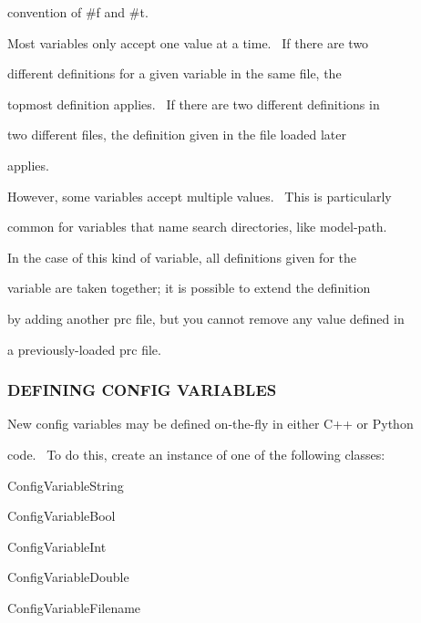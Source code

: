 \documentclass[a4paper]{article}
\begin{document}
{\color{black}
convention of {\textquotedbl}\#f{\textquotedbl} and {\textquotedbl}\#t{\textquotedbl}.}


\bigskip


\bigskip

{\color{black}
Most variables only accept one value at a time. \ If there are two}

{\color{black}
different definitions for a given variable in the same file, the}

{\color{black}
topmost definition applies. \ If there are two different definitions in}

{\color{black}
two different files, the definition given in the file loaded later}

{\color{black}
applies.}


\bigskip

{\color{black}
However, some variables accept multiple values. \ This is particularly}

{\color{black}
common for variables that name search directories, like model-path.}

{\color{black}
In the case of this kind of variable, all definitions given for the}

{\color{black}
variable are taken together; it is possible to extend the definition}

{\color{black}
by adding another prc file, but you cannot remove any value defined in}

{\color{black}
a previously-loaded prc file.}

\clearpage
\bigskip

\subsubsection[DEFINING CONFIG VARIABLES]{DEFINING CONFIG VARIABLES}
\hypertarget{RefHeading312321927442421}{}
\bigskip

{\color{black}
New config variables may be defined on-the-fly in either C++ or Python}

{\color{black}
code. \ To do this, create an instance of one of the following classes:}


\bigskip

{\color{black}
ConfigVariableString}

{\color{black}
ConfigVariableBool}

{\color{black}
ConfigVariableInt}

{\color{black}
ConfigVariableDouble}

{\color{black}
ConfigVariableFilename}
\end{document}
